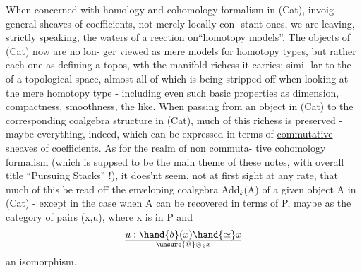 When concerned with homology and cohomology formalism in (Cat),
invoig general sheaves of coefficients, not merely locally con-%
stant ones, we are leaving, strictly speaking, the waters of a
reection on``homotopy models''. The objects of (Cat) now are no lon-%
ger viewed as mere models  for homotopy types, but rather\unsure{,}  each
one as defining a topos, wth the manifold richess it carries;  simi-%
lar to the   of a topological space, almost all of which is
being stripped off when looking at the mere homotopy type - including
even such basic properties as dimension, compactness, smoothness, 
 the like. When passing from an object in (Cat) to the corresponding
 coalgebra structure in (Cat), much of this richess is preserved
- maybe everything, indeed, which  can be expressed in terms of
\uline{commutative} sheaves of coefficients. As for the realm of non commuta-%
tive cohomology formalism (which is suppsed to be the main theme of
these notes, with overall title ``Pursuing Stacks'' !), it does'nt 
seem, not at first sight at any rate, that much of this  be read
off the enveloping coalgebra  Add$_k$(A) of a given object A in (Cat) -
except\xout{\unsure{,}}   in the case  when A can be recovered in terms
of P, maybe as the category of  pairs (x,u), where x is in P and
\[ u : \hand{\delta}(x) \hand{\simeq} x \over{\unsure{@}}{\otimes}_k x \]
an isomorphism.


